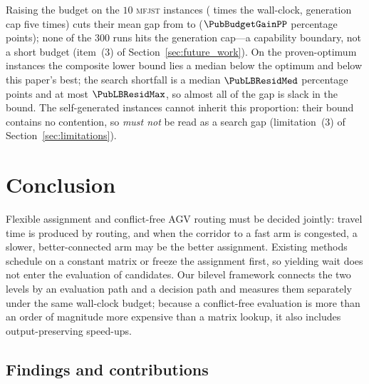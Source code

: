 \begin{table}[t]
\caption{Degenerate comparison on public benchmarks (exclusivity removed).
\textsc{opt}: MILP-proven optimum; \textsc{bk}: published best-known; gap from the best of \NSeeds{} seeds.
An asterisk marks a bitwise-identical best solution.}
\label{tab:external}
\centering
\small

\end{table}

Raising the budget on the $10$ \textsc{mfjst} instances (\PubBudgetRatio{} times the wall-clock, generation cap five times) cuts their mean gap from \PubGapLoBudget{} to \PubGapHiBudget{} ($\PubBudgetGainPP$ percentage points); none of the $300$ runs hits the generation cap---a capability boundary, not a short budget (item~(3) of Section~\ref{sec:future_work}).
On the \PubNOpt{} proven-optimum instances the composite lower bound lies a median \PubLBSlack{} below the optimum and \PubLBTotal{} below this paper's best; the search shortfall is a median $\PubLBResidMed$ percentage points and at most $\PubLBResidMax$, so almost all of the gap is slack in the bound.
The self-generated instances cannot inherit this proportion: their bound contains no contention, so \LBGapMed{} \emph{must not} be read as a search gap (limitation~(3) of Section~\ref{sec:limitations}).



\section{Conclusion}

Flexible assignment and conflict-free AGV routing must be decided jointly: travel time is produced by routing, and when the corridor to a fast arm is congested, a slower, better-connected arm may be the better assignment.
Existing methods schedule on a constant matrix or freeze the assignment first, so yielding wait does not enter the evaluation of candidates.
Our bilevel framework connects the two levels by an evaluation path and a decision path and measures them separately under the same wall-clock budget; because a conflict-free evaluation is more than an order of magnitude more expensive than a matrix lookup, it also includes output-preserving speed-ups.

\subsection{Findings and contributions}
\label{sec:contributions}

